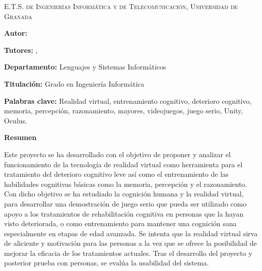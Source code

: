 
\pagestyle{fancy}
\renewcommand{\headrulewidth}{0pt}

\begin{center}
	\scshape
	E.T.S. de Ingenierías Informática y de Telecomunicación, Universidad de Granada
\end{center}

\bigskip

\begin{center}
	\Large \scshape
	\textbf{\tfgtitlename}
\end{center}

\bigskip \bigskip \bigskip

\begin{minipage}{\textwidth}

\textbf{Autor:} \tfgauthorname

\medskip

\textbf{Tutores:} \tfgtutornameA , \tfgtutornameB

\medskip


\medskip

\textbf{Departamento:} Lenguajes y Sistemas Informáticos

\medskip

\textbf{Titulación:} Grado en Ingeniería Informática

\medskip

\textbf{Palabras clave:} Realidad virtual, entrenamiento cognitivo, deterioro cognitivo, memoria, percepción, razonamiento, mayores, videojuegos, juego serio, Unity, Oculus.

\bigskip \bigskip


\end{minipage}

\begin{center}
	\textbf{Resumen}
\end{center}





Este proyecto se ha desarrollado con el objetivo de proponer y analizar el funcionamiento de la tecnología de realidad virtual como herramienta para el tratamiento del deterioro cognitivo leve así como el entrenamiento de las habilidades cognitivas básicas como la memoria, percepción y el razonamiento. Con dicho objetivo se ha estudiado la cognición humana y la realidad virtual, para desarrollar una demostración de juego serio que pueda ser utilizado como apoyo a los tratamientos de rehabilitación cognitiva en personas que la hayan visto deteriorada, o como entrenamiento para mantener una cognición sana especialmente en etapas de edad avanzada. Se intenta que la realidad virtual sirva de aliciente y motivación para las personas a la vez que se ofrece la posibilidad de mejorar la eficacia de los tratamientos actuales. Tras el desarrollo del proyecto y posterior prueba con personas, se evalúa la usabilidad del sistema.



\blankpage

